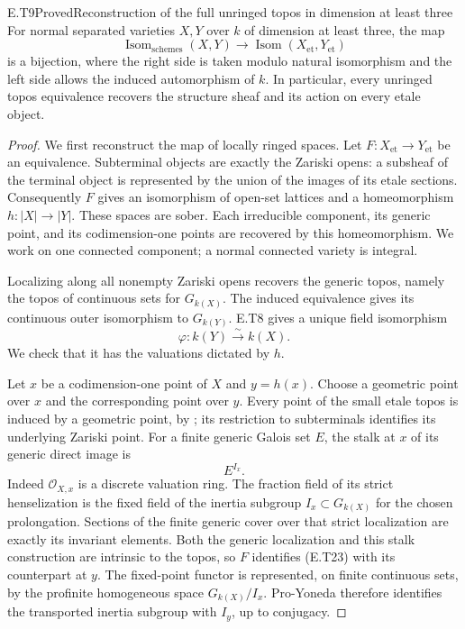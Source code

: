 \begin{result}{E.T9}{Proved}{Reconstruction of the full unringed topos in dimension at least three}
For normal separated varieties $X,Y$ over $k$ of dimension at least
three, the map
\[
 \operatorname{Isom}_{\mathrm{schemes}}(X,Y)
   \longrightarrow
 \operatorname{Isom}(X_{\mathrm{et}},Y_{\mathrm{et}})
                                                               \tag{E.T21}
\]
is a bijection, where the right side is taken modulo natural
isomorphism and the left side allows the induced automorphism
of $k$.  In particular, every unringed topos equivalence recovers
the structure sheaf and its action on every etale object.
\end{result}
\begin{proof}
We first reconstruct the map of locally ringed spaces.  Let
$F:X_{\mathrm{et}}\to Y_{\mathrm{et}}$ be an equivalence.
Subterminal objects are exactly the Zariski opens: a subsheaf
of the terminal object is represented by the union of the
images of its etale sections.  Consequently $F$ gives an
isomorphism of open-set lattices and a homeomorphism
$h:|X|\to|Y|$.  These spaces are sober.  Each irreducible
component, its generic point, and its codimension-one points
are recovered by this homeomorphism.  We work on one connected
component; a normal connected variety is integral.

Localizing along all nonempty Zariski opens recovers the generic
topos, namely the topos of continuous sets for $G_{k(X)}$.
The induced equivalence gives its continuous outer isomorphism
to $G_{k(Y)}$.  E.T8 gives a unique field isomorphism
\[
                \varphi:k(Y)\xrightarrow{\sim}k(X).          \tag{E.T22}
\]
We check that it has the valuations dictated by $h$.

Let $x$ be a codimension-one point of $X$ and $y=h(x)$.
Choose a geometric point over $x$ and the corresponding point
over $y$.  Every point of the small etale topos is induced by
a geometric point, by \cite[Lemma 59.29.12]{StacksEtalePoints};
its restriction to subterminals identifies its underlying
Zariski point.  For a finite generic Galois set $E$, the stalk at
$x$ of its generic direct image is
\[
                         E^{I_x}.                          \tag{E.T23}
\]
Indeed $\mathcal O_{X,x}$ is a discrete valuation ring.
The fraction field of its strict henselization is the fixed
field of the inertia subgroup $I_x\subset G_{k(X)}$ for the
chosen prolongation.  Sections of the finite generic cover
over that strict localization are exactly its invariant
elements.  Both the generic localization and this stalk
construction are intrinsic to the topos, so $F$ identifies
(E.T23) with its counterpart at $y$.
The fixed-point functor is represented, on finite continuous
sets, by the profinite homogeneous space $G_{k(X)}/I_x$.
Pro-Yoneda therefore identifies the transported inertia
subgroup with $I_y$, up to conjugacy.


\end{proof}
